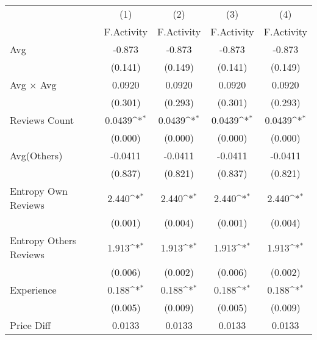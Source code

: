 {
\def\sym#1{\ifmmode^{#1}\else\(^{#1}\)\fi}
\begin{tabular}{l*{4}{c}}
\hline\hline
                    &\multicolumn{1}{c}{(1)}&\multicolumn{1}{c}{(2)}&\multicolumn{1}{c}{(3)}&\multicolumn{1}{c}{(4)}\\
                    &\multicolumn{1}{c}{F.Activity}&\multicolumn{1}{c}{F.Activity}&\multicolumn{1}{c}{F.Activity}&\multicolumn{1}{c}{F.Activity}\\
\hline
Avg                 &      -0.873       &      -0.873       &      -0.873       &      -0.873       \\
                    &     (0.141)       &     (0.149)       &     (0.141)       &     (0.149)       \\
[1em]
Avg $\times$ Avg    &      0.0920       &      0.0920       &      0.0920       &      0.0920       \\
                    &     (0.301)       &     (0.293)       &     (0.301)       &     (0.293)       \\
[1em]
Reviews Count       &      0.0439\sym{*}&      0.0439\sym{*}&      0.0439\sym{*}&      0.0439\sym{*}\\
                    &     (0.000)       &     (0.000)       &     (0.000)       &     (0.000)       \\
[1em]
Avg(Others)         &     -0.0411       &     -0.0411       &     -0.0411       &     -0.0411       \\
                    &     (0.837)       &     (0.821)       &     (0.837)       &     (0.821)       \\
[1em]
Entropy Own Reviews &       2.440\sym{*}&       2.440\sym{*}&       2.440\sym{*}&       2.440\sym{*}\\
                    &     (0.001)       &     (0.004)       &     (0.001)       &     (0.004)       \\
[1em]
Entropy Others Reviews&       1.913\sym{*}&       1.913\sym{*}&       1.913\sym{*}&       1.913\sym{*}\\
                    &     (0.006)       &     (0.002)       &     (0.006)       &     (0.002)       \\
[1em]
Experience          &       0.188\sym{*}&       0.188\sym{*}&       0.188\sym{*}&       0.188\sym{*}\\
                    &     (0.005)       &     (0.009)       &     (0.005)       &     (0.009)       \\
[1em]
Price Diff          &      0.0133       &      0.0133       &      0.0133       &      0.0133       \\

\end{tabular}}
